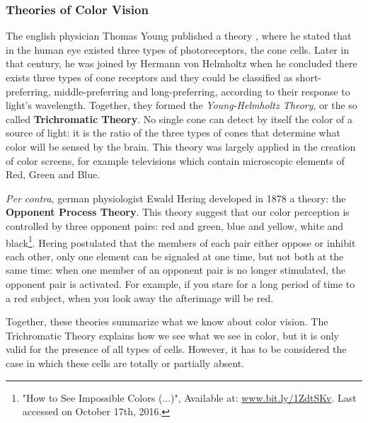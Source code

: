 \subsubsection{Theories of Color Vision}
The english physician Thomas Young published a theory \cite{Young1802}, where he stated that
in the human eye existed three types of photoreceptors, the cone cells. Later in that century, he was
joined by Hermann von Helmholtz when he concluded there exists three types of cone receptors and they could
be classified as short-preferring, middle-preferring and long-preferring, according to their response to
light’s wavelength. Together, they formed the \emph{Young-Helmholtz Theory}, or the so called \textbf{Trichromatic Theory}.
No single cone can detect by itself the color of a source of light: it is the ratio of the three types of cones that
determine what color will be sensed by the brain. This theory was largely applied in the creation of color
screens, for example televisions which contain microscopic elements of Red, Green and Blue. \par
\emph{Per contra}, german physiologist Ewald Hering developed in 1878 a theory: the
\textbf{Opponent Process Theory}. This theory suggest that our color perception is controlled by three
opponent pairs: red and green, blue and yellow, white and black\footnote{"How to See Impossible Colors (...)", Available at: \url{www.bit.ly/1ZdtSKv}. Last accessed on October 17th, 2016.}. Hering postulated that the members of each
pair either oppose or inhibit each other, only one element can be signaled at one time, but not both at the
same time: when one member of an opponent pair is no longer stimulated, the opponent pair is activated. For
example, if you stare for a long period of time to a red subject, when you look away the afterimage will be
red. \par
Together, these theories summarize what we know about color vision. The Trichromatic Theory explains how we see
what we see in color, but it is only valid for the presence of all types of cells. However, it has to be considered
the case in which these cells are totally or partially absent.
%
